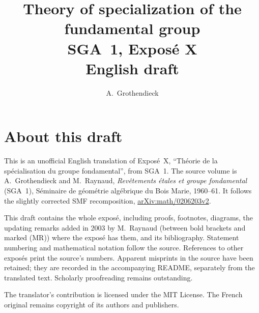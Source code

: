 \documentclass[11pt,a4paper,oneside]{amsbook}
\title[SGA~1, Expos\'e X (English draft)]{Theory of specialization of the fundamental group\\
{\normalsize SGA~1, Expos\'e X\\English draft}}
\author{A.\ Grothendieck}
\date{}
\begin{document}
\frontmatter
\maketitle

\chapter*{About this draft}
This is an unofficial English translation of Expos\'e~X,
``Th\'eorie de la sp\'ecialisation du groupe fondamental'', from SGA~1. The source volume is
A.\ Grothendieck and M.\ Raynaud,
\textit{Rev\^etements \'etales et groupe fondamental} (SGA~1),
S\'eminaire de g\'eom\'etrie alg\'ebrique du Bois Marie, 1960--61.
It follows the slightly corrected SMF recomposition,
\href{https://arxiv.org/abs/math/0206203v2}{arXiv:math/0206203v2}.

This draft contains the whole expos\'e, including proofs, footnotes,
diagrams, the updating remarks added in 2003 by M.~Raynaud (between bold
brackets and marked (MR)) where the expos\'e has them, and its bibliography.
Statement numbering and mathematical notation follow the source.
References to other expos\'es print the source's numbers. Apparent
misprints in the source have been retained; they are recorded in the
accompanying README, separately from the translated text. Scholarly
proofreading remains outstanding.

The translator's contribution is licensed under
the MIT License.
The French original remains copyright of its authors and publishers.

\tableofcontents
\mainmatter
\setcounter{chapter}{9}



\end{document}
